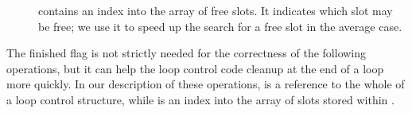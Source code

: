 \begin{description}
\item[]
contains an index into the array of free slots.
It indicates which slot may be free;
we use it to speed up the search for a free slot in the average case.

\end{description}

\noindent
The finished flag
is not strictly needed for the correctness of the following operations,
but it can help the loop control code cleanup at the end of a loop more quickly.
In our description of these operations,
\LC is a reference to the whole of a loop control structure,
while \LCS is an index into the array of slots stored within \LC.


